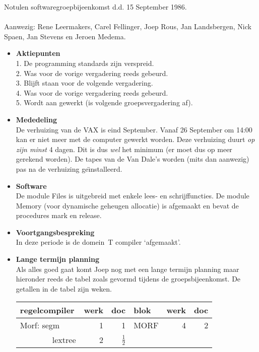 Notulen softwaregroepbijeenkomst d.d. 15 September 1986. \\ \\ 
Aanwezig: Rene Leermakers, Carel Fellinger, Joep Rous, Jan Landsbergen, Nick 
Spaen, Jan Stevens en Jeroen Medema.\\ 
\begin{itemize}
 \item {\bf Aktiepunten}\\
 1. De programming standards zijn verspreid.\\
 2. Was voor de vorige vergadering reeds gebeurd.\\
 3. Blijft staan voor de volgende vergadering.\\
 4. Was voor de vorige vergadering reeds gebeurd.\\
 5. Wordt aan gewerkt (is volgende groepsvergadering af).
 \item {\bf Mededeling}\\
 De verhuizing van de VAX is eind September. Vanaf 26 September om 14:00 kan
 er niet meer met de computer gewerkt worden. Deze verhuizing duurt {\em op 
 zijn minst} 4 dagen. Dit is dus {\em wel} het minimum (er moet 
 dus op meer gerekend worden). De tapes van de Van Dale's worden (mits dan 
 aanwezig) pas na de verhuizing ge\"{\i}nstalleerd.
 \item {\bf Software}\\
 De module Files is uitgebreid met enkele lees- en schrijffuncties. De module 
 Memory (voor dynamische geheugen allocatie) is afgemaakt en bevat de procedures
 mark en release.
 \item {\bf Voortgangsbespreking}\\
 In deze periode is de domein~T compiler `afgemaakt'.
 \item {\bf Lange termijn planning}\\
 Als alles goed gaat komt Joep nog met een lange termijn planning maar hieronder
 reeds de tabel zoals gevormd tijdens de groepsbijeenkomst. De getallen in de 
 tabel zijn weken.\\
 \begin{tabular}{||l||r|r||l||r|r||}                                   \hline
 regelcompiler     &werk&                doc&blok&werk&doc           \\ \hline
 Morf: segm        &   1&                  1&MORF        &   4&  2   \\ 
 ~~~~~~~~lextree   &   2&      $\frac{1}{2}$&            &    &      \\

\end{tabular}
\end{itemize}
